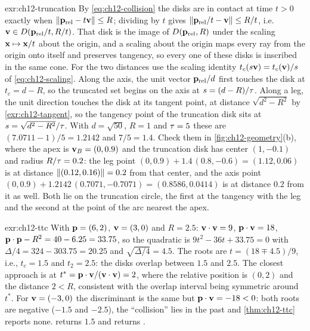 \begin{solution}{exr:ch12-truncation}
By \cref{eq:ch12-collision} the disks are in contact at time $t>0$ exactly
when $\left\lVert \mathbf{p}_{\mathrm{rel}}-t\mathbf{v} \right\rVert\le R$; dividing by $t$ gives
$\left\lVert \mathbf{p}_{\mathrm{rel}}/t-\mathbf{v} \right\rVert\le R/t$, i.e.\
$\mathbf{v}\in D(\mathbf{p}_{\mathrm{rel}}/t,R/t)$. That disk is the image of
$D(\mathbf{p}_{\mathrm{rel}},R)$ under the scaling $\mathbf{x}\mapsto\mathbf{x}/t$
about the origin, and a scaling about the origin maps every ray from the
origin onto itself and preserves tangency, so every one of these disks is
inscribed in the same cone. For the two distances use the scaling identity
$t_c(s\mathbf{v})=t_c(\mathbf{v})/s$ of \cref{eq:ch12-scaling}. Along the axis, the unit
vector $\mathbf{p}_{\mathrm{rel}}/d$ first touches the disk at $t_c=d-R$, so the
truncated set begins on the axis at $s=(d-R)/\tau$. Along a leg, the unit
direction touches the disk at its tangent point, at distance
$\sqrt{d^2-R^2}$ by \cref{exr:ch12-tangent}, so the tangency point of the
truncation disk sits at $s=\sqrt{d^2-R^2}/\tau$. With $d=\sqrt{50}$, $R=1$ and
$\tau=5$ these are $(7.0711-1)/5=1.2142$ and $7/5=1.4$. Check them in
\cref{fig:ch12-geometry}(b), where the apex is $\mathbf{v}_B=(0,0.9)$ and the
truncation disk has center $(1,-0.1)$ and radius $R/\tau=0.2$: the leg point
$(0,0.9)+1.4\,(0.8,-0.6)=(1.12,0.06)$ is at distance
$\left\lVert (0.12,0.16) \right\rVert=0.2$ from that center, and the axis point
$(0,0.9)+1.2142\,(0.7071,-0.7071)=(0.8586,0.0414)$ is at distance $0.2$ from
it as well. Both lie on the truncation circle, the first at the tangency with
the leg and the second at the point of the arc nearest the apex.
\end{solution}
\begin{solution}{exr:ch12-ttc}
With $\mathbf{p}=(6,2)$, $\mathbf{v}=(3,0)$ and $R=2.5$: $\mathbf{v}\cdot\mathbf{v}=9$, $\mathbf{p}\cdot\mathbf{v}=18$, $\mathbf{p}\cdot\mathbf{p}-R^2=40-6.25=33.75$, so the quadratic is $9t^2-36t+33.75=0$ with $\Delta/4=324-303.75=20.25$ and $\sqrt{\Delta/4}=4.5$. The roots are $t=(18\mp4.5)/9$, i.e., $t_c=1.5$ and $t_2=2.5$: the disks overlap between $1.5$ and $2.5$. The closest approach is at $t^*=\mathbf{p}\cdot\mathbf{v}/(\mathbf{v}\cdot\mathbf{v})=2$, where the relative position is $(0,2)$ and the distance $2<R$, consistent with the overlap interval being symmetric around $t^*$. For $\mathbf{v}=(-3,0)$ the discriminant is the same but $\mathbf{p}\cdot\mathbf{v}=-18<0$: both roots are negative ($-1.5$ and $-2.5$), the ``collision'' lies in the past and \cref{thm:ch12-ttc} reports none.  returns $1.5$ and  returns .
\end{solution}
